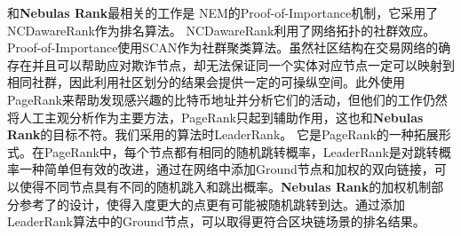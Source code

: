 和\textbf{Nebulas Rank}最相关的工作是 NEM\cite{nem}的Proof-of-Importance机制，它采用了 NCDawareRank\cite{Nikolakopoulos2013}作为排名算法。 NCDawareRank\cite{Nikolakopoulos2013}利用了网络拓扑的社群效应。Proof-of-Importance使用SCAN\cite{xu2007scan}\cite{shiokawa2015scan}\cite{chang2017mathsf}作为社群聚类算法。虽然社区结构在交易网络的确存在并且可以帮助应对欺诈节点，却无法保证同一个实体对应节点一定可以映射到相同社群，因此利用社区划分的结果会提供一定的可操纵空间。此外\textcite{Fleder2015}使用PageRank来帮助发现感兴趣的比特币地址并分析它们的活动，但他们的工作仍然将人工主观分析作为主要方法，PageRank只起到辅助作用，这也和\textbf{Nebulas Rank}的目标不符。我们采用的算法时LeaderRank\cite{Chen2013}\cite{Li2014}。 它是PageRank的一种拓展形式。在PageRank中，每个节点都有相同的随机跳转概率，LeaderRank是对跳转概率一种简单但有效的改进，通过在网络中添加Ground节点和加权的双向链接，可以使得不同节点具有不同的随机跳入和跳出概率。\textbf{Nebulas Rank}的加权机制部分参考了\textcite{Li2014}的设计，使得入度更大的点更有可能被随机跳转到达。通过添加LeaderRank算法中的Ground节点，可以取得更符合区块链场景的排名结果。

